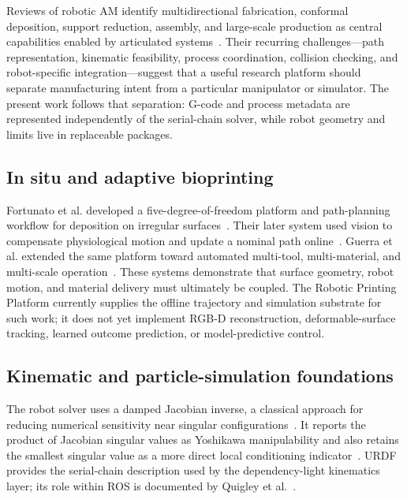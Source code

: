 \documentclass[letterpaper,10pt,conference]{ieeeconf}
\newcommand{\RPP}{Robotic Printing Platform}
\begin{document}
Reviews of robotic AM identify multidirectional fabrication, conformal
deposition, support reduction, assembly, and large-scale production as central
capabilities enabled by articulated systems~\cite{urhal2019robot,
bhatt2020expanding}.  Their recurring challenges---path representation,
kinematic feasibility, process coordination, collision checking, and
robot-specific integration---suggest that a useful research platform should
separate manufacturing intent from a particular manipulator or simulator.
The present work follows that separation: G-code and process metadata are
represented independently of the serial-chain solver, while robot geometry and
limits live in replaceable packages.

\subsection{In situ and adaptive bioprinting}

Fortunato et al. developed a five-degree-of-freedom platform and path-planning
workflow for deposition on irregular surfaces~\cite{fortunato2021platform}.
Their later system used vision to compensate physiological motion and update a
nominal path online~\cite{fortunato2022motion}.  Guerra et al. extended the
same platform toward automated multi-tool, multi-material, and multi-scale
operation~\cite{guerra2025multimaterial}.  These systems demonstrate that
surface geometry, robot motion, and material delivery must ultimately be
coupled.  The \RPP{} currently supplies the offline trajectory and simulation
substrate for such work; it does not yet implement RGB-D reconstruction,
deformable-surface tracking, learned outcome prediction, or model-predictive
control.

\subsection{Kinematic and particle-simulation foundations}

The robot solver uses a damped Jacobian inverse, a classical approach for
reducing numerical sensitivity near singular configurations~\cite{
nakamura1986singularity}.  It reports the product of Jacobian singular values as
Yoshikawa manipulability and also retains the smallest singular value as a more
direct local conditioning indicator~\cite{yoshikawa1985manipulability}.  URDF
provides the serial-chain description used by the dependency-light kinematics
layer; its role within ROS is documented by Quigley et al.~\cite{quigley2009ros}.
\end{document}
